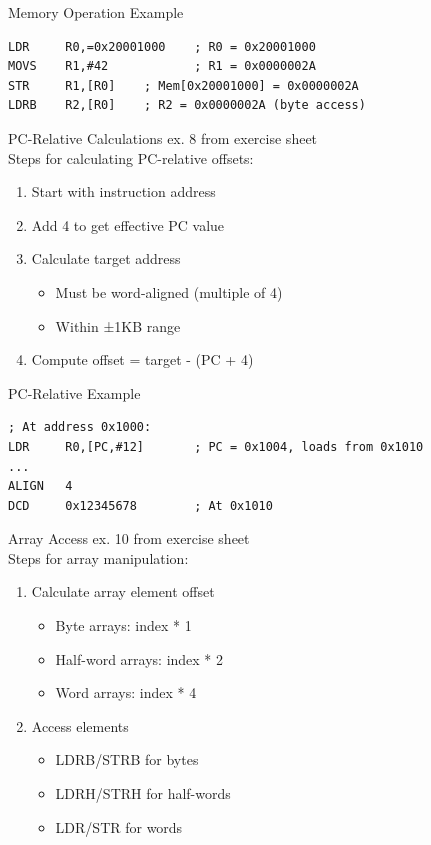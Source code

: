 \begin{example2}{Memory Operation Example} 
\begin{lstlisting}[language=armasm, style=basesmol]
LDR     R0,=0x20001000    ; R0 = 0x20001000
MOVS    R1,#42            ; R1 = 0x0000002A
STR     R1,[R0]    ; Mem[0x20001000] = 0x0000002A
LDRB    R2,[R0]    ; R2 = 0x0000002A (byte access)
\end{lstlisting}
\end{example2}


\begin{KR}{PC-Relative Calculations} ex. 8 from exercise sheet\\
Steps for calculating PC-relative offsets:
\begin{enumerate}
  \item Start with instruction address
  \item Add 4 to get effective PC value
  \item Calculate target address
    \begin{itemize}
      \item Must be word-aligned (multiple of 4)
      \item Within ±1KB range
    \end{itemize}
  \item Compute offset = target - (PC + 4)
\end{enumerate}
\end{KR}

\begin{example2}{PC-Relative Example}
\begin{lstlisting}[language=armasm, style=basesmol]
; At address 0x1000:
LDR     R0,[PC,#12]       ; PC = 0x1004, loads from 0x1010
...
ALIGN   4
DCD     0x12345678        ; At 0x1010
\end{lstlisting}
\end{example2}

\begin{KR}{Array Access} ex. 10 from exercise sheet\\
Steps for array manipulation:
\begin{enumerate}
  \item Calculate array element offset
    \begin{itemize}
      \item Byte arrays: index * 1
      \item Half-word arrays: index * 2
      \item Word arrays: index * 4
    \end{itemize}
  \item Access elements
    \begin{itemize}
      \item LDRB/STRB for bytes
      \item LDRH/STRH for half-words
      \item LDR/STR for words
    \end{itemize}
\end{enumerate}
\end{KR}

